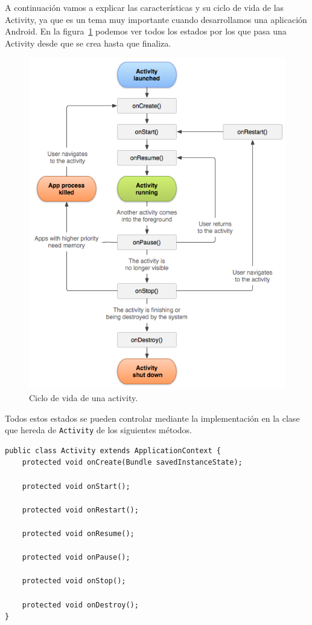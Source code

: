 A continuación vamos a explicar las características y su ciclo de vida de las Activity, ya que es un tema muy importante cuando desarrollamos una aplicación Android. En la figura~\ref{fig:cicloActivity} podemos ver todos los estados por los que pasa una Activity desde que se crea hasta que finaliza. 

\begin{figure}
  \centering
    \includegraphics[scale=0.8]{./Android/imagenes/cicloActivity.png}
  \caption{Ciclo de vida de una activity.}
  \label{fig:cicloActivity}
\end{figure}

Todos estos estados se pueden controlar mediante la implementación en la clase que hereda de \lstinline{Activity} de los siguientes métodos.

\begin{lstlisting}[style=Java]
public class Activity extends ApplicationContext {
	protected void onCreate(Bundle savedInstanceState);

	protected void onStart();

	protected void onRestart();

	protected void onResume();

	protected void onPause();

	protected void onStop();

	protected void onDestroy();
}
\end{lstlisting}

